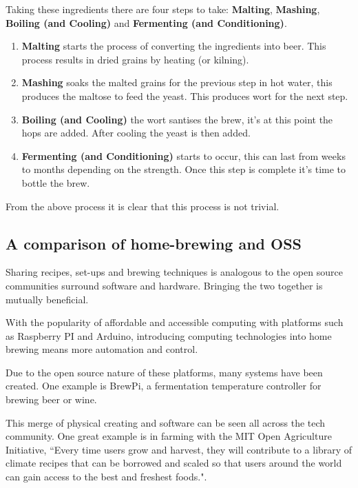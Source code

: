 Taking these ingredients there are four steps to take: \textbf{Malting}, \textbf{Mashing}, \textbf{Boiling (and Cooling)} and \textbf{Fermenting (and Conditioning)}.

\begin{enumerate}
  \item \textbf{Malting} starts the process of converting the ingredients into beer. This process results in dried grains by heating (or kilning).
  \item \textbf{Mashing} soaks the malted grains for the previous step in hot water, this produces the maltose to feed the yeast. This produces wort for the next step.
  \item \textbf{Boiling (and Cooling)} the wort santises the brew, it's at this point the hops are added. After cooling the yeast is then added.
  \item \textbf{Fermenting (and Conditioning)} starts to occur, this can last from weeks to months depending on the strength.   Once this step is complete it's time to bottle the brew.
\end{enumerate}

From the above process it is clear that this process is not trivial.

\subsection{A comparison of home-brewing and OSS} \label{l-r--compare-home-brewing-and-oss}

Sharing recipes, set-ups and brewing techniques is analogous to the open source communities surround software and hardware. Bringing the two together is mutually beneficial.

With the popularity of affordable and accessible computing with platforms such as Raspberry PI and Arduino, introducing computing technologies into home brewing means more automation and control.

Due to the open source nature of these platforms, many systems have been created. One example is BrewPi, a fermentation temperature controller for brewing beer or wine. \cite{brewpi}

This merge of physical creating and software can be seen all across the tech community. One great example is in farming with the MIT Open Agriculture Initiative, ``Every time users grow and harvest, they will contribute to a library of climate recipes that can be borrowed and scaled so that users around the world can gain access to the best and freshest foods.". \cite{climate_recipes}

